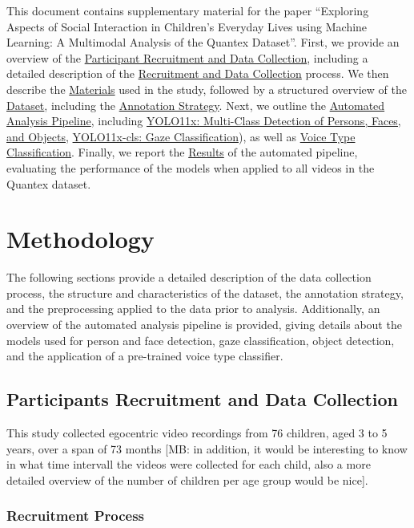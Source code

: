 \documentclass[
  man,floatsintext]{apa6}
\begin{document}
This document contains supplementary material for the paper ``Exploring Aspects of Social Interaction in Children's Everyday Lives using Machine Learning: A Multimodal Analysis of the Quantex Dataset''. First, we provide an overview of the \hyperref[sup-participants]{Participant Recruitment and Data Collection}, including a detailed description of the \hyperref[sup-recruitment]{Recruitment and Data Collection} process. We then describe the \hyperref[sup-materials]{Materials} used in the study, followed by a structured overview of the \hyperref[sup-dataset]{Dataset}, including the \hyperref[sup-annotation-strategy]{Annotation Strategy}. Next, we outline the \hyperref[sup-automatic-analysis]{Automated Analysis Pipeline}, including \hyperref[sup-yolo11x]{YOLO11x: Multi-Class Detection of Persons, Faces, and Objects}, \hyperref[sup-yolo11x-cls]{YOLO11x-cls: Gaze Classification}), as well as \hyperref[sup-voice-type]{Voice Type Classification}. Finally, we report the \hyperref[sup-results]{Results} of the automated pipeline, evaluating the performance of the models when applied to all videos in the Quantex dataset.

\section{Methodology}\label{sup-methodology}

The following sections provide a detailed description of the data collection process, the structure and characteristics of the dataset, the annotation strategy, and the preprocessing applied to the data prior to analysis. Additionally, an overview of the automated analysis pipeline is provided, giving details about the models used for person and face detection, gaze classification, object detection, and the application of a pre-trained voice type classifier.

\subsection{Participants Recruitment and Data Collection}\label{sup-participants}

This study collected egocentric video recordings from 76 children, aged 3 to 5 years, over a span of 73 months {[}MB: in addition, it would be interesting to know in what time intervall the videos were collected for each child, also a more detailed overview of the number of children per age group would be nice{]}.

\subsubsection{Recruitment Process}\label{recruitment-process-1}
\end{document}

